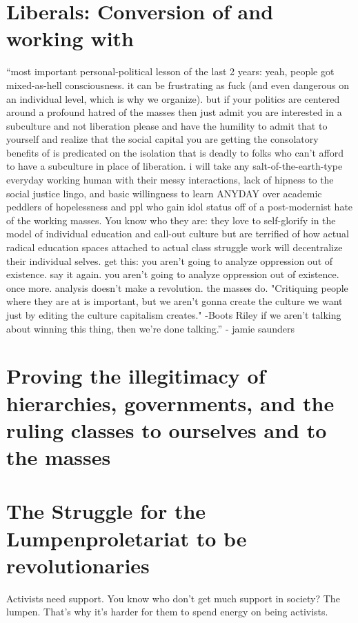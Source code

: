 \documentclass[11pt,fleqn]{memoir} %
\begin{document}
  \chapter{Liberals: Conversion of and working with}
  ``most important personal-political lesson of the last 2 years:
yeah, people got mixed-as-hell consciousness. it can be frustrating as fuck (and even dangerous on an individual level, which is why we organize). but if your politics are centered around a profound hatred of the masses then just admit you are interested in a subculture and not liberation please
and have the humility to admit that to yourself and realize that the social capital you are getting the consolatory benefits of is predicated on the isolation that is deadly to folks who can't afford to have a subculture in place of liberation.
i will take any salt-of-the-earth-type everyday working human with their messy interactions, lack of hipness to the social justice lingo, and basic willingness to learn ANYDAY over academic peddlers of hopelessness and ppl who gain idol status off of a post-modernist hate of the working masses.
You know who they are: they love to self-glorify in the model of individual education and call-out culture but are terrified of how actual radical education spaces attached to actual class struggle work will decentralize their individual selves.
get this: you aren't going to analyze oppression out of existence. say it again. you aren't going to analyze oppression out of existence. once more. analysis doesn't make a revolution. the masses do.
"Critiquing people where they are at is important, but we aren't gonna create the culture we want just by editing the culture capitalism creates." -Boots Riley
if we aren't talking about winning this thing, then we're done talking.'' - jamie saunders
  
  \chapter{Proving the illegitimacy of hierarchies, governments, and the ruling classes to ourselves and to the masses}
  
  
  

  \chapter{The Struggle for the Lumpenproletariat to be revolutionaries}
  Activists need support. You know who don't get much support in society? The lumpen. That's why it's harder for them to spend energy on being activists.
  
\end{document}
